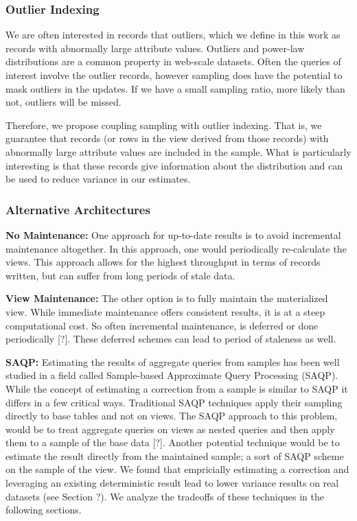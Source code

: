 \subsubsection{Outlier Indexing}
We are often interested in records that outliers, 
which we define in this work as records with abnormally large attribute values.
Outliers and power-law distributions are a common property in web-scale datasets.
Often the queries of interest involve the outlier records, however sampling does 
have the potential to mask outliers in the updates.
If we have a small sampling ratio, more likely than not, outliers will be missed.

Therefore, we propose coupling sampling with outlier indexing. 
That is, we guarantee that records (or rows in the view derived from those records) 
with abnormally large attribute values are included in the sample.
What is particularly interesting is that these records give information about the distribution 
and can be used to reduce variance in our estimates.

\subsubsection{Alternative Architectures}
\noindent\textbf{No Maintenance: }
One approach for up-to-date results is to avoid incremental maintenance altogether.
In this approach, one would periodically re-calculate the views.
This approach allows for the highest throughput in terms of records written, but can
suffer from long periods of stale data.

\vspace{1em}

\noindent\textbf{View Maintenance: }
The other option is to fully maintain the materialized view. 
While immediate maintenance offers consistent results, 
it is at a steep computational cost.
So often incremental maintenance, is deferred or done periodically [?].
These deferred schemes can lead to period of staleness as well.

\vspace{1em}

\noindent\textbf{SAQP: }
Estimating the results of aggregate queries from samples has been
well studied in a field called Sample-based Approximate Query Processing
(SAQP). While the concept of estimating a correction from a sample
is similar to SAQP it differs in a few critical ways. Traditional
SAQP techniques apply their sampling directly to base tables and not
on views. The SAQP approach to this problem, would be to treat aggregate
queries on views as nested queries and then apply them to a sample
of the base data {[}?{]}. Another potential technique would be to
estimate the result directly from the maintained sample; a sort of
SAQP scheme on the sample of the view. We found that empricially estimating
a correction and leveraging an existing deterministic result lead
to lower variance results on real datasets (see Section ?). We analyze
the tradeoffs of these techniques in the following sections.

